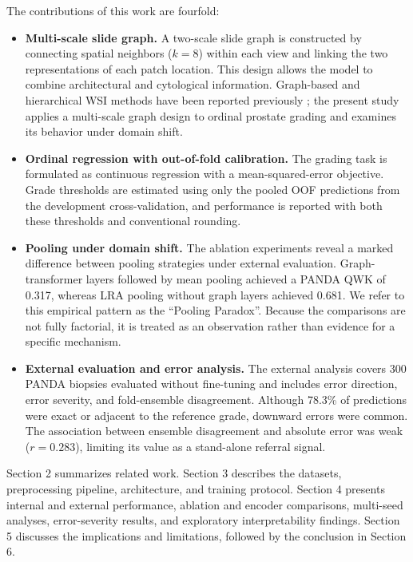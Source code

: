 \documentclass[11pt,a4paper]{article}
\begin{document}
The contributions of this work are fourfold:

\begin{itemize}[leftmargin=1.8em, itemsep=3pt, parsep=0pt]
  \item \textbf{Multi-scale slide graph.} A two-scale slide graph is constructed by connecting spatial neighbors ($k = 8$) within each view and linking the two representations of each patch location. This design allows the model to combine architectural and cytological information. Graph-based and hierarchical WSI methods have been reported previously \cite{ref9, ref14}; the present study applies a multi-scale graph design to ordinal prostate grading and examines its behavior under domain shift.
  \item \textbf{Ordinal regression with out-of-fold calibration.} The grading task is formulated as continuous regression with a mean-squared-error objective. Grade thresholds are estimated using only the pooled OOF predictions from the development cross-validation, and performance is reported with both these thresholds and conventional rounding.
  \item \textbf{Pooling under domain shift.} The ablation experiments reveal a marked difference between pooling strategies under external evaluation. Graph-transformer layers followed by mean pooling achieved a PANDA QWK of 0.317, whereas LRA pooling without graph layers achieved 0.681. We refer to this empirical pattern as the ``Pooling Paradox''. Because the comparisons are not fully factorial, it is treated as an observation rather than evidence for a specific mechanism.
  \item \textbf{External evaluation and error analysis.} The external analysis covers 300 PANDA biopsies evaluated without fine-tuning and includes error direction, error severity, and fold-ensemble disagreement. Although 78.3\% of predictions were exact or adjacent to the reference grade, downward errors were common. The association between ensemble disagreement and absolute error was weak ($r = 0.283$), limiting its value as a stand-alone referral signal.
\end{itemize}

Section 2 summarizes related work. Section 3 describes the datasets, preprocessing pipeline, architecture, and training protocol. Section 4 presents internal and external performance, ablation and encoder comparisons, multi-seed analyses, error-severity results, and exploratory interpretability findings. Section 5 discusses the implications and limitations, followed by the conclusion in Section 6.
\end{document}
